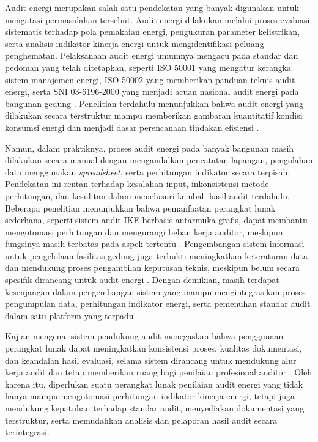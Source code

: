 Audit energi merupakan salah satu pendekatan yang banyak digunakan untuk mengatasi permasalahan tersebut. Audit energi dilakukan melalui proses evaluasi sistematis terhadap pola pemakaian energi, pengukuran parameter kelistrikan, serta analisis indikator kinerja energi untuk mengidentifikasi peluang penghematan. Pelaksanaan audit energi umumnya mengacu pada standar dan pedoman yang telah ditetapkan, seperti ISO 50001 yang mengatur kerangka sistem manajemen energi, ISO 50002 yang memberikan panduan teknis audit energi, serta SNI 03-6196-2000 yang menjadi acuan nasional audit energi pada bangunan gedung \cite{iso2018_50001,iso2014_50002,sni2000_036196}. Penelitian terdahulu menunjukkan bahwa audit energi yang dilakukan secara terstruktur mampu memberikan gambaran kuantitatif kondisi konsumsi energi dan menjadi dasar perencanaan tindakan efisiensi \cite{putra2025evaluasi}.

Namun, dalam praktiknya, proses audit energi pada banyak bangunan masih dilakukan secara manual dengan mengandalkan pencatatan lapangan, pengolahan data menggunakan \textit{spreadsheet}, serta perhitungan indikator secara terpisah. Pendekatan ini rentan terhadap kesalahan input, inkonsistensi metode perhitungan, dan kesulitan dalam menelusuri kembali hasil audit terdahulu. Beberapa penelitian menunjukkan bahwa pemanfaatan perangkat lunak sederhana, seperti sistem audit IKE berbasis antarmuka grafis, dapat membantu mengotomasi perhitungan dan mengurangi beban kerja auditor, meskipun fungsinya masih terbatas pada aspek tertentu \cite{fitri2022sistem}. Pengembangan sistem informasi untuk pengelolaan fasilitas gedung juga terbukti meningkatkan keteraturan data dan mendukung proses pengambilan keputusan teknis, meskipun belum secara spesifik dirancang untuk audit energi \cite{hermawan2022perencanaan}. Dengan demikian, masih terdapat kesenjangan dalam pengembangan sistem yang mampu mengintegrasikan proses pengumpulan data, perhitungan indikator energi, serta pemenuhan standar audit dalam satu platform yang terpadu.

Kajian mengenai sistem pendukung audit menegaskan bahwa penggunaan perangkat lunak dapat meningkatkan konsistensi proses, kualitas dokumentasi, dan keandalan hasil evaluasi, selama sistem dirancang untuk mendukung alur kerja audit dan tetap memberikan ruang bagi penilaian profesional auditor \cite{dowling2007audit}. Oleh karena itu, diperlukan suatu perangkat lunak penilaian audit energi yang tidak hanya mampu mengotomasi perhitungan indikator kinerja energi, tetapi juga mendukung kepatuhan terhadap standar audit, menyediakan dokumentasi yang terstruktur, serta memudahkan analisis dan pelaporan hasil audit secara terintegrasi.

